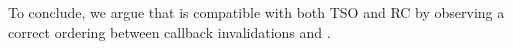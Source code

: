 
To conclude, we argue that {\recomp} is compatible with both TSO and RC by observing a correct ordering between callback invalidations and {\recomp}.



%
%
%
%
%
%
%
%

